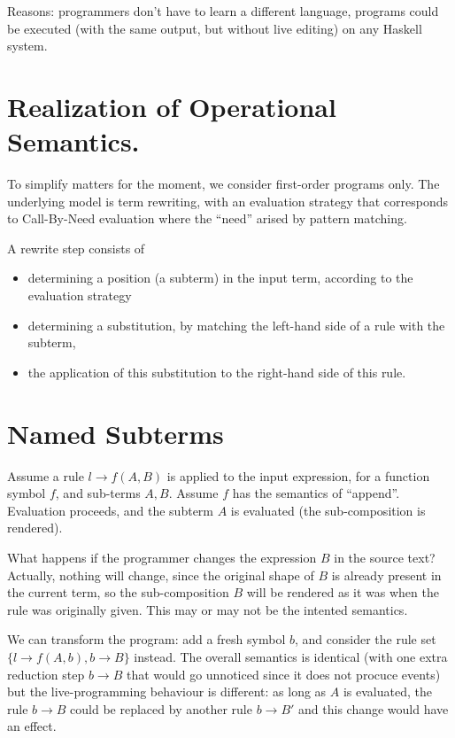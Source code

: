 \documentclass[a4paper]{easychair}
\begin{document}
Reasons: programmers don't have to learn a different language,
programs could be executed (with the same output, but without live editing) 
on any Haskell system.


\section{Realization of Operational Semantics.}

To simplify matters for the moment, we consider first-order programs only.
The underlying model is term rewriting,
with an evaluation strategy that corresponds 
to Call-By-Need evaluation where the ``need'' arised by pattern matching.

A rewrite step consists of 
\begin{itemize}
\item 
  determining a position (a subterm) in the input term,
  according to the evaluation strategy
\item
  determining a substitution,
  by matching the left-hand side of a rule
  with the subterm,
\item 
  the application of this substitution
  to the right-hand side of this rule.
\end{itemize}

\section{Named Subterms}

Assume a rule $l \to f(A,B)$ is applied to the input expression,
for a function symbol $f$, and sub-terms $A,B$.
Assume $f$ has the semantics of ``append''.
Evaluation proceeds, and the subterm $A$ is evaluated
(the sub-composition is rendered).

What happens if the programmer changes the expression $B$
in the source text? Actually, nothing will change, 
since the original shape of $B$ is already present
in the current term, so the sub-composition $B$ will
be rendered as it was when the rule was originally given.
This may or may not be the intented semantics.

We can transform the program: add a fresh symbol $b$,
and consider the rule set $\{l \to f(A, b), b\to B\}$ instead.
The overall semantics is identical (with one extra
reduction step $b\to B$ that would go unnoticed since it does not
procuce events)
but the live-programming behaviour is different:
as long as $A$ is evaluated, the rule $b\to B$
could be replaced by another rule $b\to B'$
and this change would have an effect.
\end{document}
